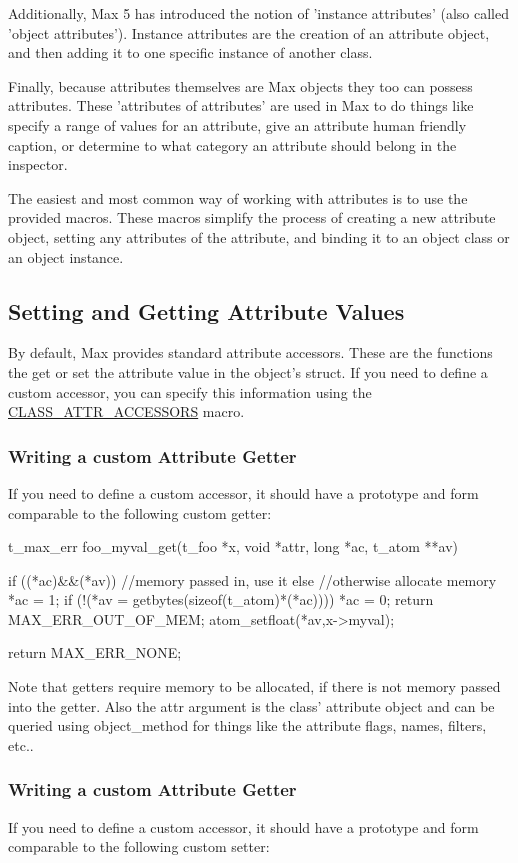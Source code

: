 Additionally, Max 5 has introduced the notion of 'instance attributes' (also called 'object attributes'). Instance attributes are the creation of an attribute object, and then adding it to one specific instance of another class.

Finally, because attributes themselves are Max objects they too can possess attributes. These 'attributes of attributes' are used in Max to do things like specify a range of values for an attribute, give an attribute human friendly caption, or determine to what category an attribute should belong in the inspector.

The easiest and most common way of working with attributes is to use the provided macros. These macros simplify the process of creating a new attribute object, setting any attributes of the attribute, and binding it to an object class or an object instance.\hypertarget{group__attr_attribute_accessors}{}\subsection{Setting and Getting Attribute Values}\label{group__attr_attribute_accessors}
By default, Max provides standard attribute accessors. These are the functions the get or set the attribute value in the object's struct. If you need to define a custom accessor, you can specify this information using the \hyperlink{group__attr_ga51b1e8466f45d86683437a77be600fb8}{CLASS\_\-ATTR\_\-ACCESSORS} macro.\hypertarget{group__attr_attribute_accessors_getter}{}\subsubsection{Writing a custom Attribute Getter}\label{group__attr_attribute_accessors_getter}
If you need to define a custom accessor, it should have a prototype and form comparable to the following custom getter:


\begin{DoxyCode}
    t_max_err foo_myval_get(t_foo *x, void *attr, long *ac, t_atom **av) 
    {
       if ((*ac)&&(*av)) {
          //memory passed in, use it
       } else {
          //otherwise allocate memory
          *ac = 1;
          if (!(*av = getbytes(sizeof(t_atom)*(*ac)))) {
             *ac = 0;
             return MAX_ERR_OUT_OF_MEM;
          }
       }
       atom_setfloat(*av,x->myval);

       return MAX_ERR_NONE;
    }
\end{DoxyCode}


Note that getters require memory to be allocated, if there is not memory passed into the getter. Also the attr argument is the class' attribute object and can be queried using object\_\-method for things like the attribute flags, names, filters, etc..\hypertarget{group__attr_attribute_accessors_getter}{}\subsubsection{Writing a custom Attribute Getter}\label{group__attr_attribute_accessors_getter}
If you need to define a custom accessor, it should have a prototype and form comparable to the following custom setter:


